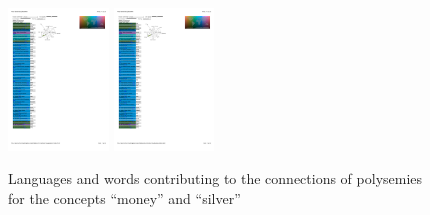 \begin{figure}[htbp]
\begin{center}
\includegraphics[width=0.238\textwidth]{img/moneysilverAreas1.pdf}
\includegraphics[width=0.238\textwidth]{img/moneysilverAreas2.pdf}
\caption{Languages and words contributing to the connections of polysemies for the concepts ``money'' and ``silver''}
\label{MoneySilverAreas}
\end{center}
\end{figure}


